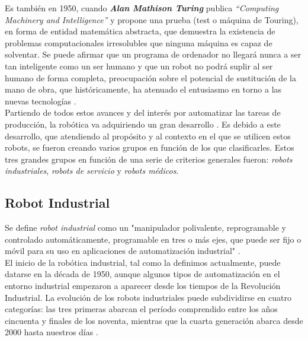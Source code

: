 Es también en 1950, cuando \textbf{\emph{Alan Mathison Turing}} publica \textit{“Computing Machinery and Intelligence”} y propone una prueba (test o máquina de Touring), en forma de entidad matemática abstracta, que demuestra la existencia de problemas computacionales irresolubles que ninguna máquina es capaz de solventar. Se puede afirmar que un programa de ordenador no llegará nunca a ser tan inteligente como un ser humano y que un robot no podrá suplir al ser humano de forma completa, \cite{Sanchez07b} preocupación sobre el potencial de sustitución de la mano de obra, que históricamente, ha atenuado el entusiasmo en torno a las nuevas tecnologías \cite{Mokyr15}.\\

Partiendo de todos estos avances y del interés por automatizar las tareas de producción, la robótica va adquiriendo un gran desarrollo \cite{Sanchez07b}. Es debido a este desarrollo, que atendiendo al propósito y al contexto en el que se utilicen estos robots, se fueron creando varios grupos en función de los que clasificarles. Estos tres grandes grupos en función de una serie de criterios generales fueron: \textit{robots industriales}, \textit{robots de servicio} y \textit{robots médicos}.

\pagebreak

\subsection{Robot Industrial}
\label{sec:robot_industrial}

Se define \textit{robot industrial} como un "manipulador polivalente, reprogramable y controlado automáticamente, programable en tres o más ejes, que puede ser fijo o móvil para su uso en aplicaciones de automatización industrial" \cite{ISO8373}.\\

El inicio de la robótica industrial, tal como la definimos actualmente, puede datarse en la década de 1950, aunque algunos tipos de automatización en el entorno industrial empezaron a aparecer desde los tiempos de la Revolución Industrial. La evolución de los robots industriales puede subdividirse en cuatro categorías: las tres primeras abarcan el período comprendido entre los años cincuenta y finales de los noventa, mientras que la cuarta generación abarca desde 2000 hasta nuestros días \cite{Gasparetto19}.

